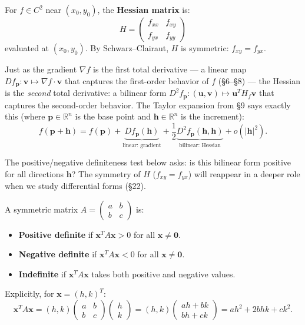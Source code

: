 \documentclass[11pt]{report}
\newcommand{\R}{\mathbb{R}}
\begin{document}
\begin{definition}
For $f \in C^2$ near $(x_0, y_0)$, the \textbf{Hessian matrix} is:
\[
H = \begin{pmatrix} f_{xx} & f_{xy} \\ f_{yx} & f_{yy} \end{pmatrix}
\]
evaluated at $(x_0, y_0)$. By Schwarz--Clairaut, $H$ is symmetric: $f_{xy} = f_{yx}$.
\end{definition}

\begin{remark}
Just as the gradient $\nabla f$ is the first total derivative --- a linear map $Df_{\mathbf{p}}: \mathbf{v} \mapsto \nabla f \cdot \mathbf{v}$ that captures the first-order behavior of $f$ (\S6--\S8) --- the Hessian is the \textit{second} total derivative: a bilinear form $D^2f_{\mathbf{p}}: (\mathbf{u}, \mathbf{v}) \mapsto \mathbf{u}^T H_f \mathbf{v}$ that captures the second-order behavior. The Taylor expansion from \S9 says exactly this (where $\mathbf{p} \in \R^n$ is the base point and $\mathbf{h} \in \R^n$ is the increment):
\[
f(\mathbf{p} + \mathbf{h}) = f(\mathbf{p}) + \underbrace{Df_{\mathbf{p}}(\mathbf{h})}_{\text{linear: gradient}} + \frac{1}{2}\underbrace{D^2f_{\mathbf{p}}(\mathbf{h}, \mathbf{h})}_{\text{bilinear: Hessian}} + o(|\mathbf{h}|^2).
\]

The positive/negative definiteness test below asks: is this bilinear form positive for all directions $\mathbf{h}$? The symmetry of $H$ ($f_{xy} = f_{yx}$) will reappear in a deeper role when we study differential forms (\S22).
\end{remark}

\begin{definition}
A symmetric matrix $A = \begin{pmatrix} a & b \\ b & c \end{pmatrix}$ is:
\begin{itemize}
    \item \textbf{Positive definite} if $\mathbf{x}^T A \mathbf{x} > 0$ for all $\mathbf{x} \neq \mathbf{0}$.
    \item \textbf{Negative definite} if $\mathbf{x}^T A \mathbf{x} < 0$ for all $\mathbf{x} \neq \mathbf{0}$.
    \item \textbf{Indefinite} if $\mathbf{x}^T A \mathbf{x}$ takes both positive and negative values.
\end{itemize}

Explicitly, for $\mathbf{x} = (h, k)^T$:
\[
\mathbf{x}^T A \mathbf{x} = (h, k) \begin{pmatrix} a & b \\ b & c \end{pmatrix} \begin{pmatrix} h \\ k \end{pmatrix} = (h, k) \begin{pmatrix} ah + bk \\ bh + ck \end{pmatrix} = ah^2 + 2bhk + ck^2.
\]
\end{definition}
\end{document}
